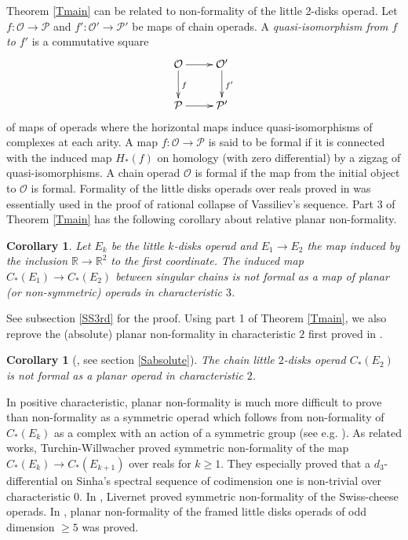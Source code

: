 \documentclass[reqno]{amsart}
\theoremstyle{definition}
\theoremstyle{plain}
\newtheorem{cor}[defi]{Corollary}
\newcommand{\RR}{\mathbb{R}}
\begin{document}
\indent Theorem \ref{Tmain} can be related to non-formality of the little 2-disks operad. Let $f:\mathcal{O}\to \mathcal{P}$ and $f':\mathcal{O}'\to \mathcal{P}'$ be maps of chain operads. A {\em quasi-isomorphism from $f$ to $f'$} is a commutative square
\[
\xymatrix{\mathcal{O} \ar[r]\ar[d] ^f& \mathcal{O'} \ar[d]^{f'} \\
\mathcal{P}\ar[r]& \mathcal{P'}}
\]
 of maps of operads where the horizontal maps induce quasi-isomorphisms of complexes at each arity. A map $f:\mathcal{O}\to\mathcal{P}$ is said to be { formal} if it is connected with the induced map $H_*(f)$  on  homology (with zero differential) by a zigzag of quasi-isomorphisms. A chain operad $\mathcal{O}$ is formal if the map from the initial object to $\mathcal{O}$ is formal.  
Formality of the little disks operads over reals proved in \cite{tamarkin, kontsevich, LV} was essentially used in the proof of rational collapse of Vassiliev's sequence. Part 3 of Theorem \ref{Tmain} 
has the following  corollary about relative planar non-formality.
\begin{cor}\label{Cnon-formality_ch3}
Let $E_k$ be the little $k$-disks operad and $E_1\to E_2$  the map induced by the inclusion $\RR\to \RR^2$ to the first coordinate. The induced map $C_*(E_1)\to C_*(E_2)$  between singular chains is not formal as a map of planar (or non-symmetric) operads in characteristic $3$.
\end{cor}
See subsection \ref{SS3rd} for the proof. 
Using  part 1 of Theorem \ref{Tmain}, we also reprove the (absolute) planar non-formality in characteristic $2$ first proved in \cite{salvatore}.
\begin{cor}[\cite{salvatore}, see section \ref{Sabsolute}]\label{Cnon-formality_ch2}
The chain little $2$-disks operad $C_*(E_2)$ is not formal as a planar  operad  in characteristic $2$.
\end{cor}
In positive characteristic, planar non-formality is much more difficult to prove than non-formality as a symmetric operad which follows from non-formality of  $C_*(E_k)$  as a complex with an action of a symmetric group (see e.g. \cite{CH}).
As related works, Turchin-Willwacher \cite{TW} proved symmetric non-formality of the map $C_*(E_k)\to C_*(E_{k+1})$ over reals for $k\geq 1$. They especially proved that a $d_3$-differential on  Sinha's spectral sequence of codimension one is non-trivial over characteristic $0$. In \cite{livernet}, Livernet proved  symmetric non-formality of the Swiss-cheese operads. In \cite{moriya2}, planar non-formality of the framed little disks operads of odd dimension $\geq 5$ was proved.\\
\end{document}
